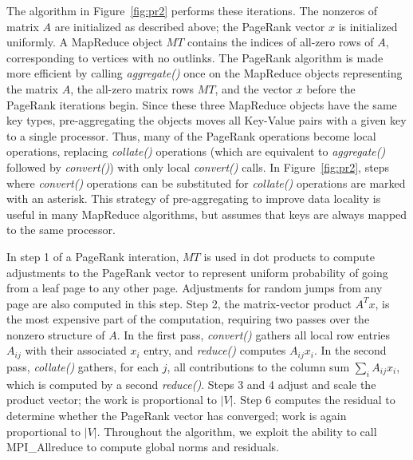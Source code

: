 The algorithm in Figure~\ref{fig:pr2} performs these
iterations.  The nonzeros of matrix $A$ are initialized as described above;
the PageRank vector $x$ is initialized uniformly.  A MapReduce object $MT$
contains the indices of all-zero rows of $A$, corresponding to vertices
with no outlinks.  
The PageRank algorithm is made more efficient by calling
{\it aggregate()} once on the MapReduce objects representing the matrix $A$, 
the all-zero matrix rows $MT$, and the vector $x$ before the PageRank 
iterations begin.  Since these three MapReduce
objects have the same key types, pre-aggregating the objects moves all
Key-Value pairs with a given key to a single processor.  Thus, many of
the PageRank operations become local operations, replacing 
{\it collate()} operations (which are equivalent to {\it aggregate()} 
followed by {\it convert()}) with only local {\it convert()} calls. 
In Figure~\ref{fig:pr2}, steps where {\it convert()} operations can be
substituted for {\it collate()} operations are marked with an asterisk.
This strategy of pre-aggregating to improve data locality is useful in
many MapReduce algorithms, but assumes that keys are always mapped to
the same processor.

In step 1 of a PageRank interation, $MT$ is used 
in dot products to compute adjustments to the
PageRank vector to represent uniform probability of going from a leaf page
to any other page.  Adjustments for random jumps from any page are also
computed in this step.  Step 2, the matrix-vector product $A^T x$, is the most
expensive part of the computation, requiring two passes over the nonzero
structure of $A$.  In the first pass, {\it convert()} 
gathers all local row entries $A_{ij}$ with their
associated $x_i$ entry, and {\it reduce()} computes $A_{ij} x_i$.  
In the second pass, 
{\it collate()} gathers, for each $j$, all contributions to the
column sum $\sum_i A_{ij} x_i$, which is computed by a second {\it reduce()}. 
Steps 3 and 4 adjust and scale the 
product vector; the work is proportional to $|V|$.  Step 6 computes the
residual to determine whether the PageRank vector has converged; work is
again proportional to $|V|$.  Throughout the algorithm, we exploit the
ability to call MPI\_Allreduce to compute global norms and residuals. 



